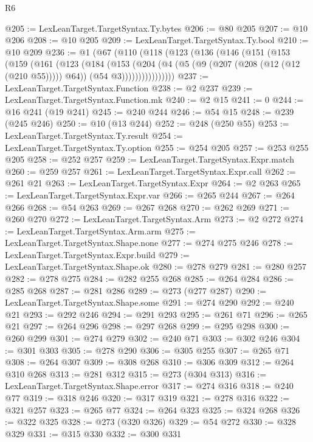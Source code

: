 \begin{lexlean}{R6}
\begin{coremodule}
@205 := LexLeanTarget.TargetSyntax.Ty.bytes
@206 := @80 @205
@207 := @10 @206
@208 := @10 @205
@209 := LexLeanTarget.TargetSyntax.Ty.bool
@210 := @10 @209
@236 := @1
    (@67
      (@110
        (@118
          (@123
            (@136
              (@146
                (@151
                  (@153
                    (@159
                      (@161
                        (@123
                          (@184
                            (@153
                              (@204
                                (@4
                                  (@5 (@9 (@207 (@208 (@12 (@12 (@210 @55))))) @64))
                                  (@54 @3))))))))))))))))
@237 := LexLeanTarget.TargetSyntax.Function
@238 := @2 @237
@239 := LexLeanTarget.TargetSyntax.Function.mk
@240 := @2 @15
@241 := 0
@244 := @16 @241 (@19 @241)
@245 := @240 @244
@246 := @54 @15
@248 := @239 (@245 @246)
@250 := @10 (@13 @244)
@252 := @248 (@250 @55)
@253 := LexLeanTarget.TargetSyntax.Ty.result
@254 := LexLeanTarget.TargetSyntax.Ty.option
@255 := @254 @205
@257 := @253 @255 @205
@258 := @252 @257
@259 := LexLeanTarget.TargetSyntax.Expr.match
@260 := @259 @257
@261 := LexLeanTarget.TargetSyntax.Expr.call
@262 := @261 @21
@263 := LexLeanTarget.TargetSyntax.Expr
@264 := @2 @263
@265 := LexLeanTarget.TargetSyntax.Expr.var
@266 := @265 @244
@267 := @264 @266
@268 := @54 @263
@269 := @267 @268
@270 := @262 @269
@271 := @260 @270
@272 := LexLeanTarget.TargetSyntax.Arm
@273 := @2 @272
@274 := LexLeanTarget.TargetSyntax.Arm.arm
@275 := LexLeanTarget.TargetSyntax.Shape.none
@277 := @274 @275 @246
@278 := LexLeanTarget.TargetSyntax.Expr.build
@279 := LexLeanTarget.TargetSyntax.Shape.ok
@280 := @278 @279
@281 := @280 @257
@282 := @278 @275
@284 := @282 @255 @268
@285 := @264 @284
@286 := @285 @268
@287 := @281 @286
@289 := @273 (@277 @287)
@290 := LexLeanTarget.TargetSyntax.Shape.some
@291 := @274 @290
@292 := @240 @21
@293 := @292 @246
@294 := @291 @293
@295 := @261 @71
@296 := @265 @21
@297 := @264 @296
@298 := @297 @268
@299 := @295 @298
@300 := @260 @299
@301 := @274 @279
@302 := @240 @71
@303 := @302 @246
@304 := @301 @303
@305 := @278 @290
@306 := @305 @255
@307 := @265 @71
@308 := @264 @307
@309 := @308 @268
@310 := @306 @309
@312 := @264 @310 @268
@313 := @281 @312
@315 := @273 (@304 @313)
@316 := LexLeanTarget.TargetSyntax.Shape.error
@317 := @274 @316
@318 := @240 @77
@319 := @318 @246
@320 := @317 @319
@321 := @278 @316
@322 := @321 @257
@323 := @265 @77
@324 := @264 @323
@325 := @324 @268
@326 := @322 @325
@328 := @273 (@320 @326)
@329 := @54 @272
@330 := @328 @329
@331 := @315 @330
@332 := @300 @331

\end{coremodule}
\end{lexlean}
